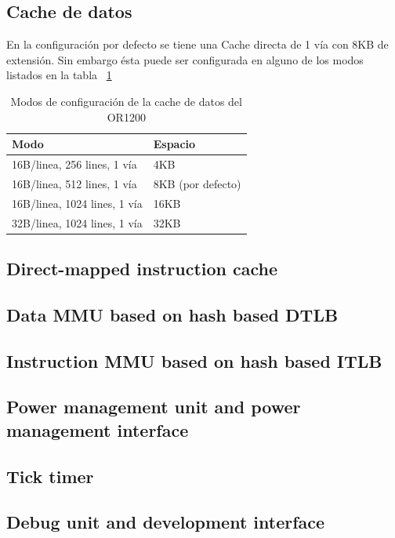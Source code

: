 	\subsection{Cache de datos}
	En la configuración por defecto se tiene una Cache directa de 1 vía con 8KB de extensión. Sin embargo ésta puede ser configurada en alguno de los
	modos listados en la tabla ~\ref{tab:cachedatos} 
	
		\begin{table}[h]
		\centering
		\begin{tabular}{ p{10cm} p{5cm}}
		\rowcolor[gray]{0.8} Modo & Espacio\\
		\hline 
		16B/linea, 256 lines, 1 vía & 4KB\\
		\hline
		16B/linea, 512 lines, 1 vía & 8KB (por defecto)\\
		\hline
		16B/linea, 1024 lines, 1 vía & 16KB\\
		\hline 
		32B/linea, 1024 lines, 1 vía & 32KB\\
		\hline
		\end {tabular}
		\caption{Modos de configuración de la cache de datos del OR1200}
		\label{tab:cachedatos}
		\end {table}
		
	\subsection{Direct-mapped instruction cache}
	
	
	
	\subsection{Data MMU based on hash based DTLB}
	
	
	\subsection{Instruction MMU based on hash based ITLB}
	
	
	\subsection{Power management unit and power management interface}
	
	
	\subsection{Tick timer}
	
	
	\subsection{Debug unit and development interface}
	
